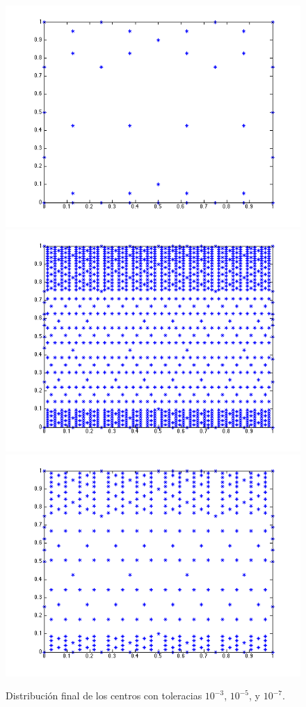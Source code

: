 \documentclass[11pt,a4paper]{article}
\begin{document}
\begin{figure}[H]
\begin{center}
\includegraphics[scale=.4]{edp1_tol1_2.png}
\includegraphics[scale=.4]{edp1_tol2_2.png}
\linebreak
\includegraphics[scale=.4]{edp1_tol3_2.png}
\caption{Distribución final de los  centros  con toleracias $10^{-3}$, $10^{-5}$, y $10^{-7}$.}
\end{center}
\end{figure}
\end{document}
